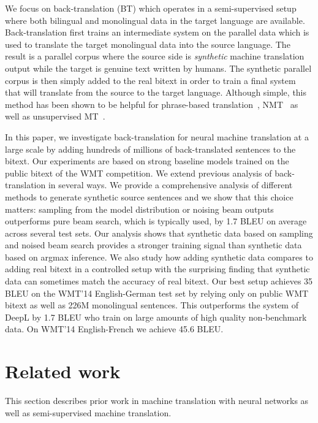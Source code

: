 \documentclass[11pt,a4paper]{article}
\begin{document}
We focus on back-translation (BT) which operates in a semi-supervised setup where both bilingual and monolingual data in the target language are available.
Back-translation first trains an intermediate system on the parallel data which is used to translate the target monolingual data into the source language. 
The result is a parallel corpus where the source side is \emph{synthetic} machine translation output while the target is genuine text written by humans.
The synthetic parallel corpus is then simply added to the real bitext in order to train a final system that will translate from the source to the target language.
Although simple, this method has been shown to be helpful for phrase-based translation~\citep{bojar:bt_pbmt:2011}, NMT~\citep{sennrich:backtranslation:2016,poncelas:investigatingBT:2018} as well as unsupervised MT~\citep{lample:unsupervised:2018}. 

In this paper, we investigate back-translation for neural machine translation at a large scale by adding hundreds of millions of back-translated sentences to the bitext.
Our experiments are based on strong baseline models trained on the public bitext of the WMT competition. 
We extend previous analysis \citep{sennrich:backtranslation:2016,poncelas:investigatingBT:2018} of back-translation in several ways. 
We provide a comprehensive analysis of different methods to generate synthetic source sentences and we show that this choice matters: 
sampling from the model distribution or noising beam outputs outperforms pure beam search, which is typically used, by 1.7 BLEU on average across several test sets.
Our analysis shows that synthetic data based on sampling and noised beam search provides a stronger training signal than synthetic data based on argmax inference.
We also study how adding synthetic data compares to adding real bitext in a controlled setup with the surprising finding that synthetic data can sometimes match the accuracy of real bitext.
Our best setup achieves 35 BLEU on the WMT'14 English-German test set by relying only on public WMT bitext as well as 226M monolingual sentences.
This outperforms the system of DeepL by 1.7 BLEU who train on large amounts of high quality non-benchmark data.
On WMT'14 English-French we achieve 45.6 BLEU.


\section{Related work}
\label{sec:related}

This section describes prior work in machine translation with neural networks as well as semi-supervised machine translation. 
\end{document}
